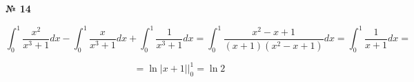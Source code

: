 \documentclass{article}
\begin{document}
\textbf{№ 14} 


$$ \int_{0}^{1} \frac{x^2}{x^3+1}dx - \int_{0}^{1} \frac{x}{x^3+1}dx + \int_{0}^{1} \frac{1}{x^3+1}dx
= \int_{0}^{1} \frac{x^2-x+1}{(x+1)(x^2-x+1)}dx
= \int_{0}^{1} \frac{1}{x+1}dx
= $$

$$ = \ln{\left| x+1 \right|} \bigg\rvert_{0}^{1}
= \ln{2}$$
\end{document}
